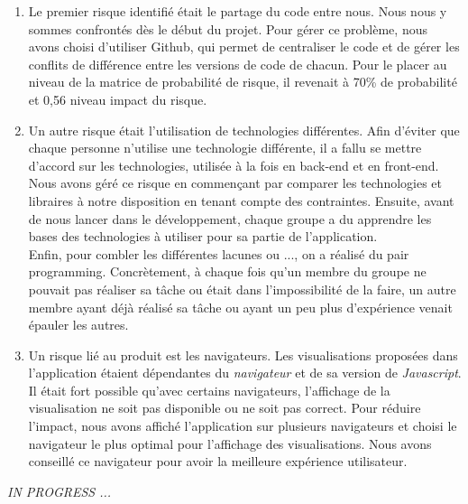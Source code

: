 \documentclass[t, 12pt, usenames,dvipsnames]{article}
\begin{document}
    \begin{enumerate}
        \item  Le premier risque identifié était le partage du code entre nous. Nous nous y sommes confrontés dès le début du projet. Pour gérer ce problème, nous avons choisi d'utiliser Github, qui permet de  centraliser le code et de gérer les conflits de différence entre les versions de code de chacun. Pour le placer au niveau de la matrice de probabilité de risque, il revenait à 70\% de probabilité et 0,56 niveau impact du risque. \\
        \item Un autre risque était l'utilisation de technologies différentes. Afin d'éviter que chaque personne n'utilise une technologie différente, il a fallu se mettre d'accord sur les technologies, utilisée à la fois en back-end et en front-end. Nous avons géré ce risque en commençant par comparer les technologies et libraires à notre disposition en tenant compte des contraintes.
        Ensuite, avant de nous lancer dans le développement, chaque groupe a du apprendre les bases des technologies à utiliser pour sa partie de l'application.\\
        Enfin, pour combler les différentes lacunes ou ..., on a réalisé du pair programming.
        Concrètement, à chaque fois qu'un membre du groupe ne pouvait pas réaliser sa tâche ou était dans l'impossibilité de la faire, un autre membre ayant déjà réalisé sa tâche ou ayant un peu plus d'expérience venait épauler les autres.
        \newline
        \item Un risque lié au produit est les navigateurs. Les visualisations proposées dans l'application étaient dépendantes du \textit{navigateur} et de sa version de \textit{Javascript}. Il était fort possible qu'avec certains navigateurs, l'affichage de la visualisation ne soit pas disponible ou ne soit pas correct. Pour réduire l'impact, nous avons affiché l'application sur plusieurs navigateurs et choisi le navigateur le plus optimal pour l'affichage des visualisations. Nous avons conseillé ce navigateur pour avoir la meilleure expérience utilisateur.
        \newline
    \end{enumerate}
    

        
    \textit{IN PROGRESS ...}
        
    
    
\end{document}
